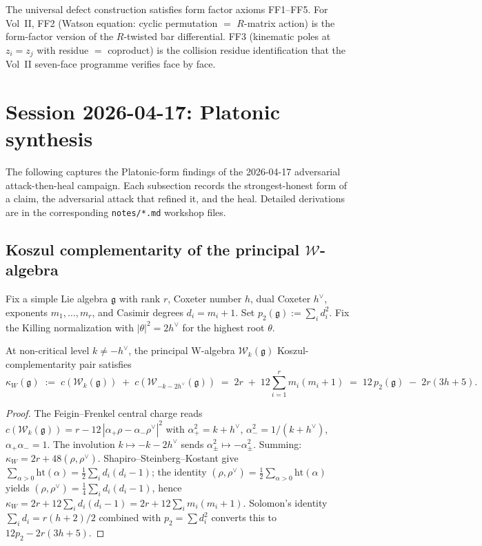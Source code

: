 \documentclass[11pt]{article}
\begin{document}
The universal defect construction satisfies form factor axioms
FF1--FF5. For Vol~II, FF2 (Watson equation: cyclic permutation
$=$ $R$-matrix action) is the form-factor version of the
$R$-twisted bar differential. FF3 (kinematic poles at $z_i = z_j$
with residue $=$ coproduct) is the collision residue identification
that the Vol~II seven-face programme verifies face by face.

\section{Session 2026-04-17: Platonic synthesis}
\label{sec:session-2026-04-17-platonic}

The following captures the Platonic-form findings of the 2026-04-17
adversarial attack-then-heal campaign. Each subsection records the
strongest-honest form of a claim, the adversarial attack that refined
it, and the heal. Detailed derivations are in the corresponding
\texttt{notes/*.md} workshop files.

\subsection{Koszul complementarity of the principal \texorpdfstring{$\mathcal{W}$}{W}-algebra}
\label{subsec:kw-chevalley-shephard-todd}

Fix a simple Lie algebra $\mathfrak{g}$ with rank $r$, Coxeter
number $h$, dual Coxeter $h^{\vee}$, exponents $m_1, \dots, m_r$,
and Casimir degrees $d_i = m_i + 1$. Set
$p_2(\mathfrak{g}) := \sum_i d_i^2$. Fix the Killing normalization
with $|\theta|^2 = 2 h^{\vee}$ for the highest root $\theta$.

\begin{theorem}
\label{thm:kw-chevalley-shephard-todd}
At non-critical level $k \ne -h^{\vee}$, the principal W-algebra
$\mathcal{W}_k(\mathfrak{g})$ Koszul-complementarity pair
satisfies
\[
  \kappa_W(\mathfrak{g})
  \;:=\;
  c(\mathcal{W}_k(\mathfrak{g}))
  \;+\;
  c(\mathcal{W}_{-k-2h^{\vee}}(\mathfrak{g}))
  \;=\;
  2r \;+\; 12 \sum_{i=1}^{r} m_i(m_i + 1)
  \;=\;
  12\,p_2(\mathfrak{g}) \;-\; 2r(3h + 5).
\]
\end{theorem}

\begin{proof}
The Feigin--Frenkel central charge reads
$c(\mathcal{W}_k(\mathfrak{g})) = r - 12\,|\alpha_+ \rho - \alpha_- \rho^{\vee}|^2$
with $\alpha_+^2 = k + h^{\vee}$, $\alpha_-^2 = 1/(k+h^{\vee})$,
$\alpha_+ \alpha_- = 1$. The involution $k \mapsto -k - 2h^{\vee}$
sends $\alpha_{\pm}^2 \mapsto -\alpha_{\pm}^2$. Summing:
$\kappa_W = 2r + 48(\rho, \rho^{\vee})$.
Shapiro--Steinberg--Kostant give
$\sum_{\alpha > 0} \mathrm{ht}(\alpha) = \tfrac{1}{2}\sum_i d_i(d_i-1)$;
the identity $(\rho, \rho^{\vee}) = \tfrac{1}{2}\sum_{\alpha > 0} \mathrm{ht}(\alpha)$
yields $(\rho, \rho^{\vee}) = \tfrac{1}{4}\sum_i d_i(d_i - 1)$, hence
$\kappa_W = 2r + 12 \sum_i d_i(d_i - 1) = 2r + 12\sum_i m_i(m_i + 1)$.
Solomon's identity $\sum_i d_i = r(h+2)/2$ combined with $p_2 = \sum d_i^2$
converts this to $12 p_2 - 2r(3h+5)$.
\end{proof}
\end{document}
